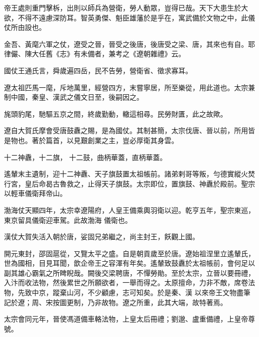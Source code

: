 
\begin{pinyinscope}

 帝王處則重門擊柝，出則以師兵為營衛，勞人動眾，豈得已哉。天下大患生於大欲，不得不遠慮深防耳。智英勇傑、魁臣雄藩於是乎在，寓武備於文物之中，此儀仗所由設也。



 金吾、黃麾六軍之仗，遼受之晉，晉受之後唐，後唐受之梁、唐，其來也有自。耶律儼、陳大任舊《志》有未備者，兼考之《遼朝雜禮》云。



 國仗王通氏言，舜歲遍四岳，民不告勞，營衛省、徵求寡耳。



 遼太祖匹馬一麾，斥地萬里，經營四方，末嘗寧居，所至樂從，用此道也。太宗兼制中國，秦皇、漢武之儀文日至，後嗣因之。



 旄頭豹尾，馳驅五京之間，終歲勤動，轍這相尋。民勞財匱，此之故歟。



 遼自大賀氏摩會受唐鼓纛之賜，是為國仗。其制甚簡，太宗伐唐、晉以前，所用皆是物也。著於篇首，以見艱創業之主，豈必厚衛其身雲。



 十二神纛，十二旗，
 十二鼓，曲柄華蓋，直柄華蓋。



 遙輦末主遺制，迎十二神纛、天子旗鼓置太祖帳前。諸弟剌哥等叛，勻德實縱火焚行宮，皇后命曷古魯救之，止得天子旗鼓。太宗即位，置旗鼓、神纛於殿前。聖宗以輕車儀衛拜帝山。



 渤海仗天顯四年，太宗幸遼陽府，人皇王備乘輿羽衛以迎。乾亨五年，聖宗東巡，東京留具儀衛迎車駕。此故渤海
 儀衛也。



 漢仗大賀失活入朝於唐，娑固兄弟繼之，尚主封王，飫觀上國。



 開元東封，邵固扈從，又覽太平之盛。自是朝貢歲至於唐。遼始祖涅里立遙輦氏，世為國相，目見耳聞，歆企帝王之容渾有年矣。遙輦致鼓纛於太祖帳前，會何足以副其雄心霸氣之所睥睨哉。闕後交梁聘唐，不憚勞勛。至於太宗，立晉以要冊禮，入汴而收法物，然後累世之所願欲者，一舉而得之。太原擅命，力非不敵，席卷法物，先致中京，蹤棄山河，不少顧慮，志可知矣。於是秦、漢
 以來帝王文物盡筆記於遼；周、宋按圖更制，乃非故物。遼之所重，此其大端，故特著焉。



 太宗會同元年，晉使馮道備車輅法物，上皇太后冊禮；劉邈、盧重備禮，上皇帝尊號。




\end{pinyinscope}
